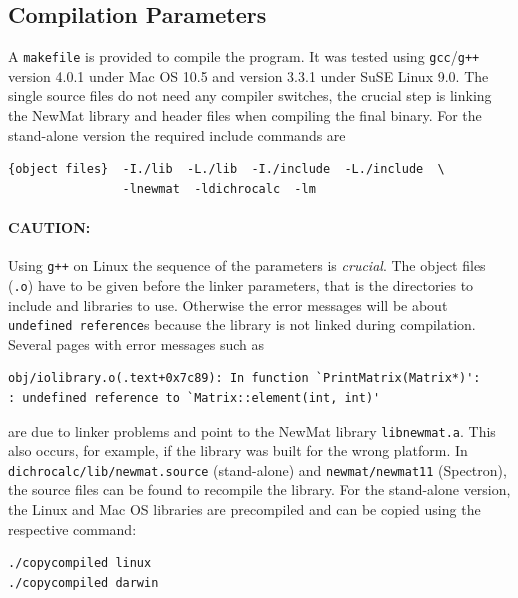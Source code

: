 \documentclass[11pt, letterpaper]{article}
\begin{document}


\newpage

\subsection{Compilation Parameters}

A \verb'makefile' is provided to compile the program. It was tested using \verb'gcc'/\verb'g++' version 4.0.1 under Mac OS 10.5 and version 3.3.1 under SuSE Linux 9.0. The single source files do not need any compiler switches, the crucial step is linking the NewMat library and header files when compiling the final binary. For the stand-alone version the required include commands are

\begin{verbatim}
{object files}  -I./lib  -L./lib  -I./include  -L./include  \
                -lnewmat  -ldichrocalc  -lm
\end{verbatim}

\paragraph{CAUTION:} Using \verb'g++' on Linux the sequence of the parameters is \emph{crucial}. The object files (\verb'.o') have to be given before the linker parameters, that is the directories to include and libraries to use. Otherwise the error messages will be about \verb'undefined reference's because the library is not linked during compilation. Several pages with error messages such as
\begin{verbatim}
obj/iolibrary.o(.text+0x7c89): In function `PrintMatrix(Matrix*)':
: undefined reference to `Matrix::element(int, int)'
\end{verbatim}
are due to linker problems and point to the NewMat library \verb'libnewmat.a'. This also occurs, for example, if the library was built for the wrong platform. In \verb'dichrocalc/lib/newmat.source' (stand-alone) and \verb'newmat/newmat11' (Spectron), the source files can be found to recompile the library. For the stand-alone version, the Linux and Mac OS libraries are precompiled and can be copied using the respective command:

\begin{verbatim}
./copycompiled linux
./copycompiled darwin
\end{verbatim}


\end{document}
